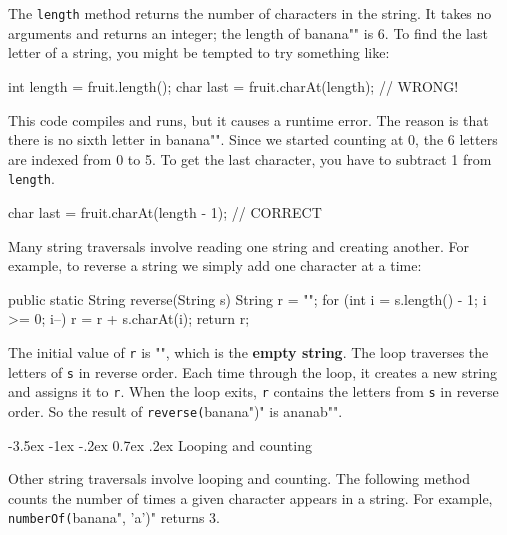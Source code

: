 \documentclass[12pt]{book}
\makeatletter
\theoremstyle{exercise}
\newcommand{\java}[1]{\verb"#1"}
\renewcommand{\section}{\@startsection{section}{1}{\z@}%
    {-3.5ex \@plus -1ex \@minus -.2ex}%
    {0.7ex \@plus.2ex}%
    {\normalfont\Large\bfseries}}
\newcommand{\java}[1]{\lstinline{#1}} %
\makeatother
\begin{document}

The \java{length} method returns the number of characters in the string.
It takes no arguments and returns an integer; the length of \java{"banana"} is 6.
To find the last letter of a string, you might be tempted to try something like:

\begin{code}
    int length = fruit.length();
    char last = fruit.charAt(length);      // WRONG!
\end{code}

This code compiles and runs, but it causes a runtime error.
The reason is that there is no sixth letter in \java{"banana"}.
Since we started counting at 0, the 6 letters are indexed from 0 to 5.
To get the last character, you have to subtract 1 from \java{length}.

\begin{code}
    char last = fruit.charAt(length - 1);  // CORRECT
\end{code}

Many string traversals involve reading one string and creating another.
For example, to reverse a string we simply add one character at a time:

\begin{code}
    public static String reverse(String s) {
        String r = "";
        for (int i = s.length() - 1; i >= 0; i--) {
            r = r + s.charAt(i);
        }
        return r;
    }
\end{code}


The initial value of \java{r} is \java{""}, which is the {\bf empty string}.
The loop traverses the letters of \java{s} in reverse order.
Each time through the loop, it creates a new string and assigns it to \java{r}.
When the loop exits, \java{r} contains the letters from \java{s} in reverse order.
So the result of \java{reverse("banana")} is \java{"ananab"}.

\section{Looping and counting}
\label{loopcount}


Other string traversals involve looping and counting.
The following method counts the number of times a given character appears in a string.
For example, \java{numberOf("banana", 'a')} returns 3.
\end{document}
